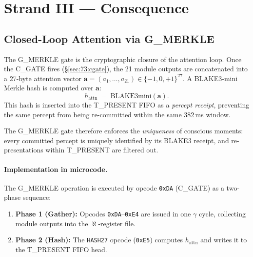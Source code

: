 
\section{Strand III --- Consequence}
\label{sec:73:strand-iii}

\subsection{Closed-Loop Attention via G\_MERKLE}
\label{sec:73:merkle}

The G\_MERKLE gate is the cryptographic closure of the
attention loop.
Once the C\_GATE fires (§\ref{sec:73:cgate}), the 21 module
outputs are concatenated into a 27-byte attention vector
$\mathbf{a} = (a_{1}, \ldots, a_{21}) \in \{-1,0,+1\}^{27}$.
A BLAKE3-mini Merkle hash is computed over $\mathbf{a}$:
\[
  h_{\text{attn}} \;=\; \mathrm{BLAKE3mini}(\mathbf{a}).
\]
This hash is inserted into the T\_PRESENT FIFO as a
\emph{percept receipt}, preventing the same percept from being
re-committed within the same 382\,ms window.

The G\_MERKLE gate therefore enforces the \emph{uniqueness} of
conscious moments: every committed percept is uniquely identified
by its BLAKE3 receipt, and re-presentations within T\_PRESENT are
filtered out.

\paragraph{Implementation in microcode.}
The G\_MERKLE operation is executed by opcode \texttt{0xDA}
(C\_GATE) as a two-phase sequence:
\begin{enumerate}
  \item \textbf{Phase 1 (Gather):} Opcodes \texttt{0xDA}--\texttt{0xE4}
    are issued in one $\gamma$ cycle, collecting module outputs into
    the $\aleph$-register file.
  \item \textbf{Phase 2 (Hash):} The \texttt{HASH27} opcode
    (\texttt{0xE5}) computes $h_{\mathrm{attn}}$ and writes it to
    the T\_PRESENT FIFO head.
\end{enumerate}

